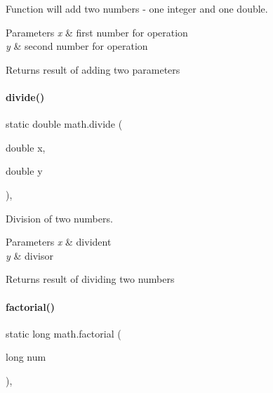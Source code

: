 Function will add two numbers -\/ one integer and one double. 


\begin{DoxyParams}{Parameters}
{\em x} & first number for operation \\
\hline
{\em y} & second number for operation \\
\hline
\end{DoxyParams}
\begin{DoxyReturn}{Returns}
result of adding two parameters 
\end{DoxyReturn}
\mbox{\label{classmath_a52284400f6e457532e27c40b553e4f01}} 
\paragraph{\texorpdfstring{divide()}{divide()}}
{\footnotesize\ttfamily static double math.\+divide (\begin{DoxyParamCaption}\item[{double}]{x,  }\item[{double}]{y }\end{DoxyParamCaption})\hspace{0.3cm}{\ttfamily [inline]}, {\ttfamily [static]}}



Division of two numbers. 


\begin{DoxyParams}{Parameters}
{\em x} & divident \\
\hline
{\em y} & divisor \\
\hline
\end{DoxyParams}
\begin{DoxyReturn}{Returns}
result of dividing two numbers 
\end{DoxyReturn}
\mbox{\label{classmath_acd82ca2b91e16ffd3c74e361d659f890}} 
\paragraph{\texorpdfstring{factorial()}{factorial()}}
{\footnotesize\ttfamily static long math.\+factorial (\begin{DoxyParamCaption}\item[{long}]{num }\end{DoxyParamCaption})\hspace{0.3cm}{\ttfamily [inline]}, {\ttfamily [static]}}



